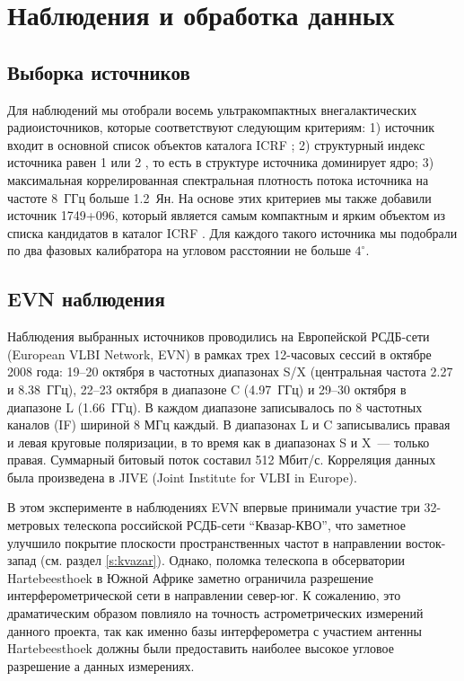 \section{Наблюдения и обработка данных}

\subsection{Выборка источников}
Для наблюдений мы отобрали восемь ультракомпактных внегалактических радиоисточников, которые
соответствуют следующим критериям: 1) источник входит в основной список объектов каталога ICRF
\cite{Ma_1998}; 2) структурный индекс источника равен 1 или 2 \cite{Ma_1998}, то есть в структуре
источника доминирует ядро; 3) максимальная коррелированная спектральная плотность потока источника
на частоте 8~ГГц больше 1.2~Ян. На основе этих критериев мы также добавили источник 1749+096,
который является самым компактным и ярким объектом из списка кандидатов в каталог ICRF
\cite{Ma_1998}. Для каждого такого источника мы подобрали по два фазовых калибратора на угловом
расстоянии не больше $4^\circ$.

\subsection{EVN наблюдения}
Наблюдения выбранных источников проводились на Европейской РСДБ-сети (European VLBI Network, EVN) в
рамках трех 12-часовых сессий в октябре 2008 года: 19--20 октября в частотных диапазонах S/X
(центральная частота 2.27 и 8.38~ГГц), 22--23 октября в диапазоне C (4.97~ГГц) и 29--30 октября в
диапазоне L (1.66~ГГц).
В каждом диапазоне записывалось по 8 частотных каналов (IF) шириной 8 МГц каждый. В диапазонах L и C
записывались правая и левая круговые поляризации, в то время как в диапазонах S и X~--- только
правая. Суммарный битовый поток составил 512 Мбит/с. Корреляция данных была произведена в
JIVE (Joint Institute for VLBI in Europe).

В этом эксперименте в наблюдениях EVN впервые принимали участие три 32-метровых телескопа российской
РСДБ-сети ``Квазар-КВО'', что заметное улучшило покрытие плоскости пространственных частот в
направлении восток-запад (см. раздел \ref{s:kvazar}). Однако, поломка телескопа в обсерватории
Hartebeesthoek в Южной Африке заметно ограничила разрешение интерферометрической сети в направлении
север-юг. К сожалению, это драматическим образом повлияло на точность астрометрических измерений
данного проекта, так как именно базы интерферометра с участием  антенны Hartebeesthoek должны были
предоставить наиболее высокое угловое разрешение а данных измерениях.

